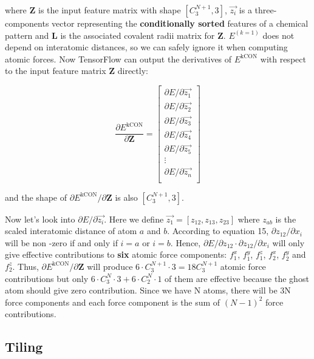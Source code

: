 \noindent where \textbf{Z} is the input feature matrix with shape $[C^{N+1}_{3}, 3]$, 
$\vec{z_{i}}$ is a three-components vector representing the \textbf{conditionally sorted} 
features of a chemical pattern and \textbf{L} is the associated covalent radii matrix for 
\textbf{Z}. $E^{(k=1)}$ does not depend on interatomic distances, so we can safely ignore it 
when computing atomic forces. Now TensorFlow can output the derivatives of 
$E^{\mathrm{kCON}}$ with respect to the input feature matrix \textbf{Z} directly:

\begin{equation}
\frac{\partial{E^{\mathrm{kCON}}}}{\partial{\mathbf{Z}}} = 
\left[
	\begin{array}{c}
		\partial{E} / \partial{\vec{z_{1}}}  \\
		\partial{E} / \partial{\vec{z_{2}}}  \\
		\partial{E} / \partial{\vec{z_{3}}}  \\
		\partial{E} / \partial{\vec{z_{4}}}  \\
		\partial{E} / \partial{\vec{z_{5}}}  \\
		\vdots \\
		\partial{E} / \partial{\vec{z_{n}}}  \\
	\end{array}
\right]
\end{equation}

\noindent and the shape of $\partial{E^{\mathrm{kCON}}} / \partial{\boldsymbol{Z}}$ is
also $[C^{N+1}_{3}, 3]$. 

Now let's look into $\partial{E} / \partial{\vec{z_{i}}}$. Here we define 
$\vec{z_{1}} = [z_{12}, z_{13}, z_{23}]$ where $z_{ab}$ is the scaled interatomic distance of
atom $a$ and $b$. According to equation 15, $\partial{z_{12}} / \partial{x_{i}}$ will be non
-zero if and only if $i = a$ or $i = b$. Hence, 
$\partial{E} / \partial{z_{12}} \cdot \partial{z_{12}} / \partial{x_{i}}$ will only give 
effective contributions to \textbf{six} atomic force components: $f^x_1$, $f^y_1$, $f^z_1$, 
$f^x_2$, $f^y_2$ and $f^z_2$. Thus, $\partial{E^{\mathrm{kCON}}} / \partial{\boldsymbol{Z}}$ 
will produce $6 \cdot C^{N+1}_3 \cdot 3=18C^{N+1}_3$ atomic force contributions but only
$6 \cdot C^N_3 \cdot 3 + 6 \cdot C^N_2 \cdot 1$ of them are effective because the ghost atom 
should give zero contribution. Since we have N atoms, there will be 3N force components and 
each force component is the sum of $(N - 1)^2$ force contributions.

\subsection{Tiling}

